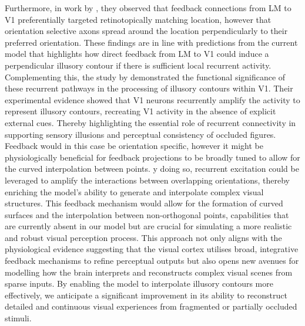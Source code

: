 \documentclass[12pt]{article}
\begin{document}
Furthermore, in work by \textcite{marquesFunctionalOrganizationCortical2018}, they observed that feedback connections from LM to V1 preferentially targeted retinotopically matching location, however that orientation selective axons spread around the location perpendicularly to their preferred orientation. These findings are in line with predictions from the current model that highlights how direct feedback from LM to V1 could induce a perpendicular illusory contour if there is sufficient local recurrent activity. Complementing this, the study by \textcite{shinRecurrentPatternCompletion2023} demonstrated the functional significance of these recurrent pathways in the processing of illusory contours within V1. Their experimental evidence showed that V1 neurons recurrently amplify the activity to represent illusory contours, recreating V1 activity in the absence of explicit external cues. Thereby highlighting the essential role of recurrent connectivity in supporting sensory illusions and perceptual consistency of occluded figures. Feedback would in this case be orientation specific, however it might be physiologically beneficial for feedback projections to be broadly tuned to allow for the curved interpolation between points. y doing so, recurrent excitation could be leveraged to amplify the interactions between overlapping orientations, thereby enriching the model's ability to generate and interpolate complex visual structures. This feedback mechanism would allow for the formation of curved surfaces and the interpolation between non-orthogonal points, capabilities that are currently absent in our model but are crucial for simulating a more realistic and robust visual perception process. This approach not only aligns with the physiological evidence suggesting that the visual cortex utilises broad, integrative feedback mechanisms to refine perceptual outputs but also opens new avenues for modelling how the brain interprets and reconstructs complex visual scenes from sparse inputs. By enabling the model to interpolate illusory contours more effectively, we anticipate a significant improvement in its ability to reconstruct detailed and continuous visual experiences from fragmented or partially occluded stimuli. 
\end{document}
